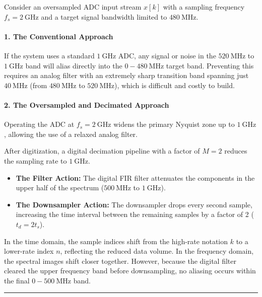 \documentclass[
]{article}
\providecommand{\tightlist}{%
  \setlength{\itemsep}{0pt}\setlength{\parskip}{0pt}}
\begin{document}
Consider an oversampled ADC input stream \(x[k]\) with a sampling
frequency \(f_s = 2\ \text{GHz}\) and a target signal bandwidth limited
to \(480\ \text{MHz}\).

\paragraph{1. The Conventional
Approach}\label{the-conventional-approach}

If the system uses a standard \(1\ \text{GHz}\) ADC, any signal or noise
in the \(520\ \text{MHz}\) to \(1\ \text{GHz}\) band will alias directly
into the \(0 - 480\ \text{MHz}\) target band. Preventing this requires
an analog filter with an extremely sharp transition band spanning just
\(40\ \text{MHz}\) (from \(480\ \text{MHz}\) to \(520\ \text{MHz}\)),
which is difficult and costly to build.

\paragraph{2. The Oversampled and Decimated
Approach}\label{the-oversampled-and-decimated-approach}

Operating the ADC at \(f_s = 2\ \text{GHz}\) widens the primary Nyquist
zone up to \(1\ \text{GHz}\), allowing the use of a relaxed analog
filter.

After digitization, a digital decimation pipeline with a factor of
\(M=2\) reduces the sampling rate to \(1\ \text{GHz}\).

\begin{itemize}
\tightlist
\item
  \textbf{The Filter Action:} The digital FIR filter attenuates the
  components in the upper half of the spectrum (\(500\ \text{MHz}\) to
  \(1\ \text{GHz}\)).
\item
  \textbf{The Downsampler Action:} The downsampler drops every second
  sample, increasing the time interval between the remaining samples by
  a factor of 2 (\(t_d = 2 t_s\)).
\end{itemize}

In the time domain, the sample indices shift from the high-rate notation
\(k\) to a lower-rate index \(n\), reflecting the reduced data volume.
In the frequency domain, the spectral images shift closer together.
However, because the digital filter cleared the upper frequency band
before downsampling, no aliasing occurs within the final
\(0 - 500\ \text{MHz}\) band.

\begin{center}\rule{0.5\linewidth}{0.5pt}\end{center}
\end{document}
